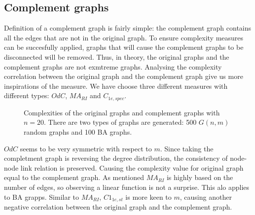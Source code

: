 \documentclass[12pt]{article}
\begin{document}
\subsection{Complement graphs}
Definition of a complement graph is fairly simple: the complement graph contains all the edges that are not in the original graph. To ensure complexity measures can be succesfully applied, graphs that will cause the complement graphs to be disconnected will be removed. Thus, in theory, the original graphs and the complement graphs are not exmtreme graphs. Analysing the complexity correlation between the original graph and the complement graph give us more inspirations of the measure. We have choose three different measures with different types: $OdC$, $MA_{RI}$ and $C_{1e,spec}$.
\begin{figure}[h!]
    \caption{Complexities of the original graphs and complement graphs with $n=20$. There are two types of graphs are generated: 500 $G(n,m)$ random graphs and 100 BA graphs.}
    \label{fig:complement}
\end{figure}
\noindent
$OdC$ seems to be very symmetric with respect to $m$. Since taking the completment graph is reversing the degree distribution, the consistency of node-node link relation is preserved. Causing the complexity value for original graph equal to the complement graph. As mentioned $MA_{RI}$ is highly based on the number of edges, so observing a linear function is not a surprise. This alo applies to BA grapps. Similar to $MA_{RI}$, $C1_{1e,st}$ is more keen to $m$, causing another negative correlation between the original graph and the complement graph.\\
\end{document}
